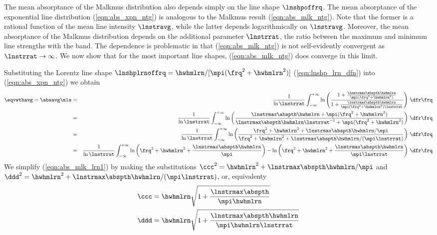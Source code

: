 \documentclass[12pt]{article}
\begin{document}
The mean absorptance of the Malkmus distribution also depends
simply on the line shape $\lnshpoffrq$. 
The mean absorptance of the exponential line distribution
(\ref{eqn:abs_xpn_ntg}) is analogous to the Malkmus result
(\ref{eqn:abs_mlk_ntg}).
Note that the former is a rational function of the mean line intensity 
$\lnstravg$, while the latter depends logarithmically on $\lnstravg$.
Moreover, the mean absorptance of the Malkmus distribution depends on 
the additional parameter $\lnstrrat$, the ratio between the maximum
and minimum line strengths with the band.
The dependence is problematic in that (\ref{eqn:abs_mlk_ntg}) is
not self-evidently convergent as $\lnstrrat \rightarrow \infty$.
We now show that for the most important line shapes, 
\absavg (\ref{eqn:abs_mlk_ntg}) does converge in this limit.

Substituting the Lorentz line shape 
$\lnshplrnoffrq = \hwhmlrn/[\mpi ( \frq^{2} + \hwhmlrn^{2} ) ]$
(\ref{eqn:lnshp_lrn_dfn}) into (\ref{eqn:abs_xpn_ntg}) we obtain
\begin{eqnarray}
\eqvwthavg = \absavg \mls 
& = & 
\frac{1}{\ln \lnstrrat}
\int_{-\infty}^{+\infty} 
\ln \left( 
\frac{1 + \frac{\lnstrmax \abspth \hwhmlrn}{\mpi (\frq^{2} + \hwhmlrn^{2})}}
{1 + \frac{\lnstrmax \abspth \hwhmlrn}{\mpi (\frq^{2} + \hwhmlrn^{2})\lnstrrat}}
\right) \,\dfr\frq \nonumber \\
& = & 
\frac{1}{\ln \lnstrrat}
\int_{-\infty}^{+\infty} 
\ln \left( 
\frac{\lnstrmax \abspth \hwhmlrn + \mpi (\frq^{2} + \hwhmlrn^{2})}
{\lnstrmax \abspth \hwhmlrn \lnstrrat^{-1} + \mpi (\frq^{2} + \hwhmlrn^{2})}
\right) \,\dfr\frq \nonumber \\
& = & 
\frac{1}{\ln \lnstrrat}
\int_{-\infty}^{+\infty} 
\ln \left( 
\frac{\frq^{2} + \hwhmlrn^{2} + \lnstrmax \abspth \hwhmlrn / \mpi}
{\frq^{2} + \hwhmlrn^{2} + \lnstrmax \abspth \hwhmlrn / (\mpi \lnstrrat)}
\right) \,\dfr\frq \nonumber \\
& = & 
\frac{1}{\ln \lnstrrat}
\int_{-\infty}^{+\infty} 
\ln \left( \frq^{2} + \hwhmlrn^{2} + \frac{\lnstrmax \abspth \hwhmlrn}{\mpi} \right)
- \ln \left( \frq^{2} + \hwhmlrn^{2} + \frac{\lnstrmax \abspth
\hwhmlrn}{\mpi \lnstrrat} \right)
\,\dfr\frq
\label{eqn:abs_mlk_lrn1}
\end{eqnarray}
We simplify (\ref{eqn:abs_mlk_lrn1}) by making the substitutions
$\ccc^{2} = \hwhmlrn^{2} + \lnstrmax \abspth \hwhmlrn / \mpi$ and
$\ddd^{2} = \hwhmlrn^{2} + \lnstrmax \abspth \hwhmlrn / ( \mpi
\lnstrrat)$, or, equivalenty
\begin{subequations}
\label{eqn:mlk_lrn_ccc_ddd}
\begin{align}
\label{eqn:mlk_lrn_ccc}
\ccc & = \hwhmlrn \sqrt{1 + \frac{\lnstrmax \abspth}{\mpi \hwhmlrn}} \\ 
\label{eqn:mlk_lrn_ddd}
\ddd & = \hwhmlrn \sqrt{1 + \frac{\lnstrmax \abspth \hwhmlrn}{\mpi \hwhmlrn \lnstrrat}}
\end{align}
\end{subequations}
\end{document}

